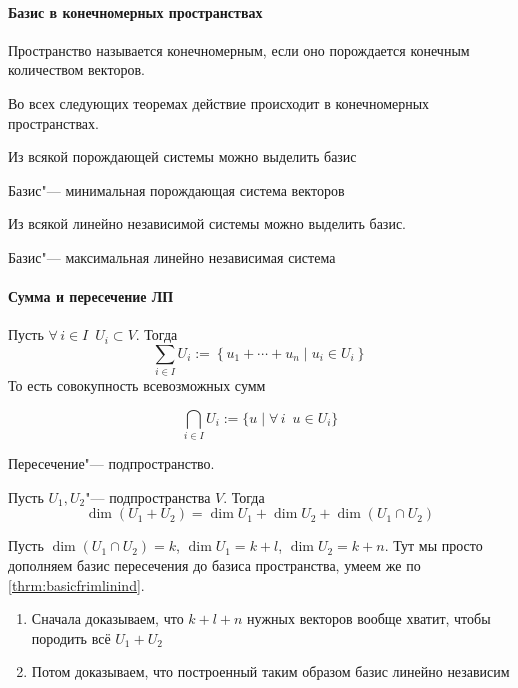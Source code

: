 \documentclass[12pt]{../../../notes}
\begin{document}
\paragraph{Базис в конечномерных пространствах}

\begin{defn}\label{defn:linsp::findimbasis::findim}
  Пространство называется конечномерным, если оно порождается конечным количеством векторов.
\end{defn}

Во всех следующих теоремах действие происходит в конечномерных пространствах.

\begin{thrm}\label{thrm:basisfromspan}
  Из всякой порождающей системы можно выделить базис
\end{thrm}

\begin{imp}
  Базис"--- минимальная порождающая система векторов
\end{imp}

\begin{thrm}\label{thrm:basicfrimlinind}
  Из всякой линейно независимой системы можно выделить базис.
\end{thrm}
\begin{imp}
  Базис"--- максимальная линейно независимая система
\end{imp}

\paragraph{Сумма и пересечение ЛП}
\begin{defn}\label{defn:linspsum}
  Пусть $\forall\, i \in I \;\: U_i \subset V$. Тогда 
  \[
    \sum_{i\in I} U_i := \left\{ u_{1} + \dotsb + u_{n} \mid u_{i} \in U_i\right\}
  \]
  То есть совокупность всевозможных сумм
\end{defn}
\begin{defn}\label{defn:linspintersec}
  \[
    \bigcap_{i\in I} U_i := \{u \mid \forall\, i \;\: u \in U_i\}
  \]
\end{defn}

\begin{rem*}
  Пересечение"--- подпространство.
\end{rem*}

\begin{thrm}\label{thrm:dimsumlinsp}
  Пусть $U_1, U_2 $"--- подпространства $V$.
  Тогда
  \[
    \dim (U_1+U_2) = \dim U_1 + \dim U_2 + \dim (U_1 \cap U_2)
  \]
\end{thrm}
\begin{ittproof}
  Пусть $\dim(U_1 \cap U_2) = k$, $\dim U_1 = k + l$, $\dim U_2 = k + n$. Тут мы просто дополняем
  базис пересечения до базиса пространства, умеем же по \ref{thrm:basicfrimlinind}.
  \begin{enumerate}
    \item Сначала доказываем, что $k + l + n$ нужных векторов вообще хватит, чтобы породить всё
      $U_1 + U_2$
    \item Потом доказываем, что построенный таким образом базис линейно независим
  \end{enumerate}
\end{ittproof}
\end{document}
